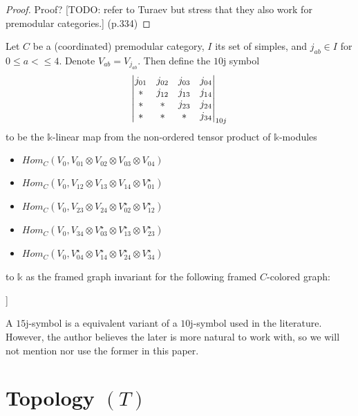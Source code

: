 \begin{proof}
  Proof?
  [TODO: refer to Turaev but stress that they also work for premodular categories.] (p.334)
\end{proof}

\begin{definition}[$10$j-symbol]\label{def/10j-symbol}
  Let $C$ be a (coordinated) premodular category, $I$ its set of
  simples, and $j_{ab} \in I$ for $0 \leq a < \leq 4$. Denote
  $V_{ab} = V_{j_{ab}}$. Then define the $10$j symbol
  $$
  \begin{vmatrix} j_{01} & j_{02} & j_{03} & j_{04} \\ * & j_{12} & j_{13} & j_{14} \\ * & * & j_{23} & j_{24} \\ * & * & * & j_{34} \\ \end{vmatrix}_{10j}
  $$
  to be the $\mathbb{k}$-linear map from the non-ordered tensor
  product of $\mathbb{k}$-modules
  \begin{itemize}
    \item
          $Hom_{C}(V_{0}, V_{01} \otimes V_{02} \otimes V_{03} \otimes V_{04})$
    \item
          $Hom_{C}(V_{0}, V_{12} \otimes V_{13} \otimes V_{14} \otimes V_{01}^{\star})$
    \item
          $Hom_{C}(V_{0}, V_{23} \otimes V_{24} \otimes V_{02}^{\star} \otimes V_{12}^{\star})$
    \item
          $Hom_{C}(V_{0}, V_{34} \otimes V_{03}^{\star} \otimes V_{13}^{\star} \otimes V_{23}^{\star})$
    \item
          $Hom_{C}(V_{0}, V_{04}^{\star} \otimes V_{14}^{\star} \otimes V_{24}^{\star} \otimes V_{34}^{\star})$
  \end{itemize}
  to $\mathbb{k}$ as the framed graph invariant for the following
  framed $C$-colored graph:

  \noindent [TODO: add graphics [20220217T143000 (2)]]
\end{definition}

\begin{remark}[$15$j-symbol]\label{remark/15j-symbol}
  A $15$j-symbol is a equivalent variant of a $10$j-symbol used
  in the literature. However, the author believes the later is
  more natural to work with, so we will not mention nor use the
  former in this paper.
\end{remark}


\section{Topology $(T)$}
